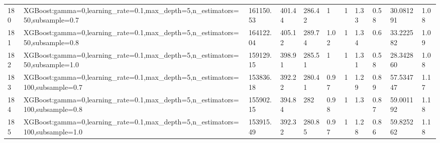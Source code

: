 \begin{longtable}{C{0.8cm} L{2cm} C{1.15cm} C{1.15cm} C{1.15cm} C{1.15cm} C{0.85cm} C{1.25cm} C{1.2cm} C{1.5cm} C{1.0cm}}
180 & XGBoost:\newline gamma=0,\newline learning\_rate=0.1,\newline max\_depth=5,\newline n\_estimators=50,\newline subsample=0.7 & 161150.53 & 401.44 & 286.42 & 1 & 1 & 1.33 & 0.58 & 30.081291 & 1.08 \\
181 & XGBoost:\newline gamma=0,\newline learning\_rate=0.1,\newline max\_depth=5,\newline n\_estimators=50,\newline subsample=0.8 & 164122.04 & 405.12 & 289.74 & 1.02 & 1 & 1.34 & 0.6 & 33.222582 & 1.09 \\
182 & XGBoost:\newline gamma=0,\newline learning\_rate=0.1,\newline max\_depth=5,\newline n\_estimators=50,\newline subsample=1.0 & 159129.15 & 398.91 & 285.51 & 1 & 1 & 1.31 & 0.58 & 28.342860 & 1.08 \\
183 & XGBoost:\newline gamma=0,\newline learning\_rate=0.1,\newline max\_depth=5,\newline n\_estimators=100,\newline subsample=0.7 & 153836.18 & 392.22 & 280.41 & 0.97 & 1 & 1.29 & 0.89 & 57.534747 & 1.17 \\
184 & XGBoost:\newline gamma=0,\newline learning\_rate=0.1,\newline max\_depth=5,\newline n\_estimators=100,\newline subsample=0.8 & 155902.15 & 394.84 & 282 & 0.98 & 1 & 1.3 & 0.87 & 59.001192 & 1.18 \\
185 & XGBoost:\newline gamma=0,\newline learning\_rate=0.1,\newline max\_depth=5,\newline n\_estimators=100,\newline subsample=1.0 & 153915.49 & 392.32 & 280.85 & 0.97 & 1 & 1.28 & 0.86 & 59.825262 & 1.18 \\

\end{longtable}
